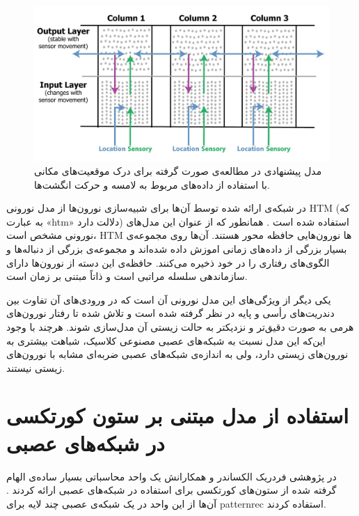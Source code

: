 \documentclass[12pt]{report}
\begin{document}
	\begin{figure}[H]
		\centering
		\includegraphics[width=1.0\linewidth]{hawkins2017.jpg}
		\caption[NS]{
			مدل پیشنهادی در مطالعه‌ی صورت گرفته \cite{Hawkins2017} برای درک موقعیت‌های مکانی با استفاده از داده‌های مربوط به لامسه و حرکت انگشت‌ها.
		}
		\label{fig:hawkins2017} 
	\end{figure}

در شبکه‌ی ارائه شده توسط آن‌ها برای شبیه‌سازی نورون‌ها از مدل نورونی  HTM (که به عبارت «\gls{htm}» دلالت دارد) استفاده شده است \cite{HTM2011}. همانطور که از عنوان این مدل‌های نورونی مشخص است، HTM ها نورون‌هایی حافظه محور هستند. آن‌ها روی مجموعه‌ی بسیار بزرگی از داده‌های زمانی اموزش داده شده‌اند و مجموعه‌ی بزرگی از دنباله‌ها و الگوی‌های رفتاری را در خود ذخیره می‌کنند. حافظه‌ی این دسته از نورون‌ها دارای سازماندهی سلسله مراتبی است و ذاتاً مبتنی بر زمان است.

یکی دیگر از ویژگی‌های این مدل نورونی آن است که در ورودی‌های آن تفاوت بین دندریت‌های رأسی و پایه در نظر گرفته شده است و تلاش شده تا رفتار نورون‌های هرمی به صورت دقیق‌تر و نزدیکتر به حالت زیستی آن مدل‌سازی شوند. هرچند با وجود این‌که این مدل نسبت به شبکه‌های عصبی مصنوعی کلاسیک، شباهت بیشتری به نورون‌های زیستی دارد، ولی به اندازه‌ی شبکه‌های عصبی ضربه‌ای مشابه با نورون‌های زیستی نیستند.

\section{استفاده‌ از مدل مبتنی بر ستون کورتکسی در شبکه‌های عصبی}
در پژوهشی فردریک الکساندر و همکارانش یک واحد محاسباتی  بسیار ساده‌ی الهام گرفته شده از ستون‌های کورتکسی برای استفاده در شبکه‌های عصبی ارائه کردند \cite{Alexandre1991}. آن‌ها از این واحد در یک شبکه‌ی عصبی چند لایه برای \gls{patternrec} استفاده کردند.
\end{document}
